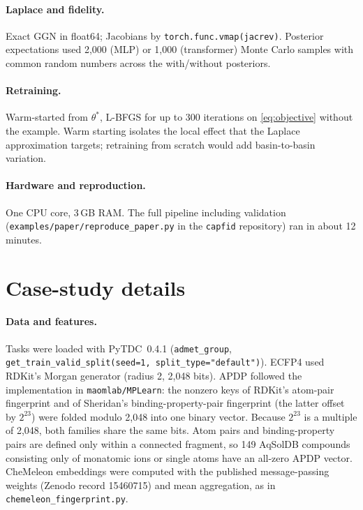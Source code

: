 \documentclass[10pt,twocolumn,letterpaper]{article}
\theoremstyle{definition}
\begin{document}
\paragraph{Laplace and fidelity.} Exact GGN in float64; Jacobians by \texttt{torch.func.vmap(jacrev)}. Posterior expectations used 2{,}000 (MLP) or 1{,}000 (transformer) Monte Carlo samples with common random numbers across the with/without posteriors.

\paragraph{Retraining.} Warm-started from $\theta^*$, L-BFGS for up to 300 iterations on \cref{eq:objective} without the example. Warm starting isolates the local effect that the Laplace approximation targets; retraining from scratch would add basin-to-basin variation.

\paragraph{Hardware and reproduction.} One CPU core, 3\,GB RAM. The full pipeline including validation (\texttt{examples/paper/reproduce\_paper.py} in the \texttt{capfid} repository) ran in about 12 minutes.


\section{Case-study details}\label{app:tdc}
\paragraph{Data and features.} Tasks were loaded with PyTDC~0.4.1 (\texttt{admet\_group}, \texttt{get\_train\_valid\_split(seed=1, split\_type="default")}). ECFP4 used RDKit's Morgan generator (radius 2, 2{,}048 bits). APDP followed the implementation in \texttt{maomlab/MPLearn}: the nonzero keys of RDKit's atom-pair fingerprint and of Sheridan's binding-property-pair fingerprint (the latter offset by $2^{23}$) were folded modulo 2{,}048 into one binary vector. Because $2^{23}$ is a multiple of 2{,}048, both families share the same bits. Atom pairs and binding-property pairs are defined only within a connected fragment, so 149 AqSolDB compounds consisting only of monatomic ions or single atoms have an all-zero APDP vector. CheMeleon embeddings were computed with the published message-passing weights (Zenodo record 15460715) and mean aggregation, as in \texttt{chemeleon\_fingerprint.py}.
\end{document}
